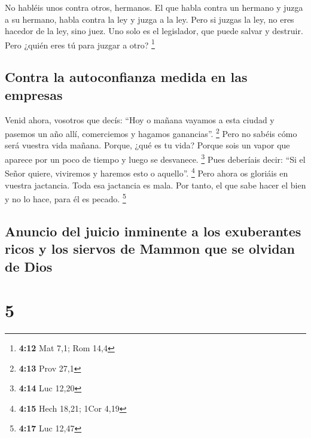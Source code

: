  No habléis unos contra otros, hermanos. El que habla
contra un hermano y juzga a su hermano, habla contra la ley y juzga a la
ley. Pero si juzgas la ley, no eres hacedor de la ley, sino juez.
 Uno solo es el legislador, que puede salvar y destruir.
Pero ¿quién eres tú para juzgar a otro? \footnote{\textbf{4:12} Mat 7,1;
  Rom 14,4}

\hypertarget{contra-la-autoconfianza-medida-en-las-empresas}{%
\subsection{Contra la autoconfianza medida en las
empresas}\label{contra-la-autoconfianza-medida-en-las-empresas}}

 Venid ahora, vosotros que decís: ``Hoy o mañana vayamos
a esta ciudad y pasemos un año allí, comerciemos y hagamos ganancias''.
\footnote{\textbf{4:13} Prov 27,1}  Pero no sabéis cómo
será vuestra vida mañana. Porque, ¿qué es tu vida? Porque sois un vapor
que aparece por un poco de tiempo y luego se desvanece. \footnote{\textbf{4:14}
  Luc 12,20}  Pues deberíais decir: ``Si el Señor quiere,
viviremos y haremos esto o aquello''. \footnote{\textbf{4:15} Hech
  18,21; 1Cor 4,19}  Pero ahora os gloriáis en vuestra
jactancia. Toda esa jactancia es mala.  Por tanto, el que
sabe hacer el bien y no lo hace, para él es pecado. \footnote{\textbf{4:17}
  Luc 12,47}

\hypertarget{anuncio-del-juicio-inminente-a-los-exuberantes-ricos-y-los-siervos-de-mammon-que-se-olvidan-de-dios}{%
\subsection{Anuncio del juicio inminente a los exuberantes ricos y los
siervos de Mammon que se olvidan de
Dios}\label{anuncio-del-juicio-inminente-a-los-exuberantes-ricos-y-los-siervos-de-mammon-que-se-olvidan-de-dios}}

\hypertarget{section-4}{%
\section{5}\label{section-4}}

